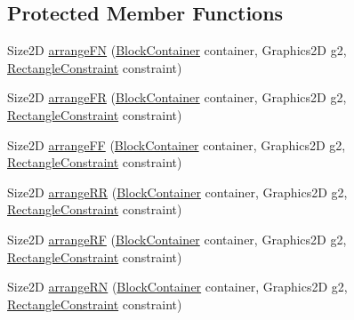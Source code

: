 \subsection*{Protected Member Functions}
\begin{DoxyCompactItemize}
\item 
Size2D \mbox{\hyperlink{classorg_1_1jfree_1_1chart_1_1block_1_1_flow_arrangement_a6cb3a19ad680305b6918d1d542ed6e92}{arrange\+FN}} (\mbox{\hyperlink{classorg_1_1jfree_1_1chart_1_1block_1_1_block_container}{Block\+Container}} container, Graphics2D g2, \mbox{\hyperlink{classorg_1_1jfree_1_1chart_1_1block_1_1_rectangle_constraint}{Rectangle\+Constraint}} constraint)
\item 
Size2D \mbox{\hyperlink{classorg_1_1jfree_1_1chart_1_1block_1_1_flow_arrangement_a18d53c41bc50996bcdeb51e8a73a83ce}{arrange\+FR}} (\mbox{\hyperlink{classorg_1_1jfree_1_1chart_1_1block_1_1_block_container}{Block\+Container}} container, Graphics2D g2, \mbox{\hyperlink{classorg_1_1jfree_1_1chart_1_1block_1_1_rectangle_constraint}{Rectangle\+Constraint}} constraint)
\item 
Size2D \mbox{\hyperlink{classorg_1_1jfree_1_1chart_1_1block_1_1_flow_arrangement_a29421a20932912168ba20ec4bcb7ed10}{arrange\+FF}} (\mbox{\hyperlink{classorg_1_1jfree_1_1chart_1_1block_1_1_block_container}{Block\+Container}} container, Graphics2D g2, \mbox{\hyperlink{classorg_1_1jfree_1_1chart_1_1block_1_1_rectangle_constraint}{Rectangle\+Constraint}} constraint)
\item 
Size2D \mbox{\hyperlink{classorg_1_1jfree_1_1chart_1_1block_1_1_flow_arrangement_ad5384b9cbcb96765f7a151040914000d}{arrange\+RR}} (\mbox{\hyperlink{classorg_1_1jfree_1_1chart_1_1block_1_1_block_container}{Block\+Container}} container, Graphics2D g2, \mbox{\hyperlink{classorg_1_1jfree_1_1chart_1_1block_1_1_rectangle_constraint}{Rectangle\+Constraint}} constraint)
\item 
Size2D \mbox{\hyperlink{classorg_1_1jfree_1_1chart_1_1block_1_1_flow_arrangement_a641846f958e628a7600898efc1d48317}{arrange\+RF}} (\mbox{\hyperlink{classorg_1_1jfree_1_1chart_1_1block_1_1_block_container}{Block\+Container}} container, Graphics2D g2, \mbox{\hyperlink{classorg_1_1jfree_1_1chart_1_1block_1_1_rectangle_constraint}{Rectangle\+Constraint}} constraint)
\item 
Size2D \mbox{\hyperlink{classorg_1_1jfree_1_1chart_1_1block_1_1_flow_arrangement_a1d0899f89784be70974cade8749b4f75}{arrange\+RN}} (\mbox{\hyperlink{classorg_1_1jfree_1_1chart_1_1block_1_1_block_container}{Block\+Container}} container, Graphics2D g2, \mbox{\hyperlink{classorg_1_1jfree_1_1chart_1_1block_1_1_rectangle_constraint}{Rectangle\+Constraint}} constraint)

\end{DoxyCompactItemize}
